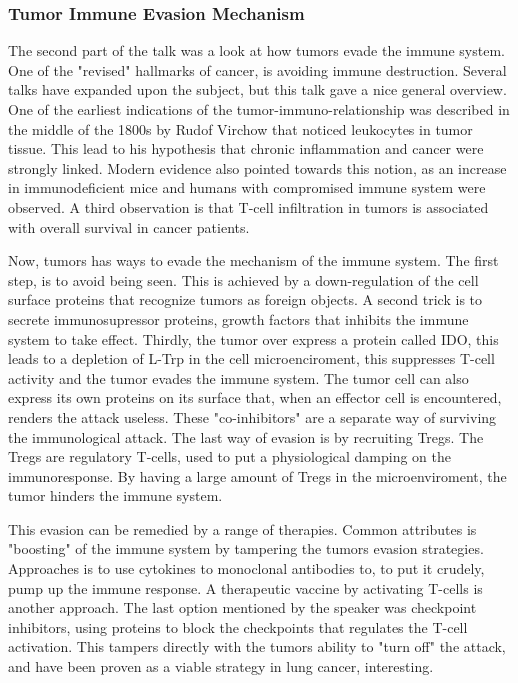 \documentclass[12p]{article}
\begin{document}
\subsubsection*{Tumor Immune Evasion Mechanism}

The second part of the talk was a look at how tumors evade the immune system.
One of the "revised" hallmarks of cancer, is avoiding immune destruction.
Several talks have expanded upon the subject, but this talk gave a nice general overview.
One of the earliest indications of the tumor-immuno-relationship was described in the middle of the 1800s by Rudof Virchow that noticed leukocytes in tumor tissue.
This lead to his hypothesis that chronic inflammation and cancer were strongly linked.
Modern evidence also pointed towards this notion, as an increase in immunodeficient mice and humans with compromised immune system were observed.
A third observation is that T-cell infiltration in tumors is associated with overall survival in cancer patients.

Now, tumors has ways to evade the mechanism of the immune system.
The first step, is to avoid being seen.
This is achieved by a down-regulation of the cell surface proteins that recognize tumors as foreign objects.
A second trick is to secrete immunosupressor proteins, growth factors that inhibits the immune system to take effect.
Thirdly, the tumor over express a protein called IDO, this leads to a depletion of L-Trp in the cell microenciroment, this suppresses T-cell activity and the tumor evades the immune system.
The tumor cell can also express its own proteins on its surface that, when an effector cell is encountered, renders the attack useless.
These "co-inhibitors" are a separate way of surviving the immunological attack.
The last way of evasion is by recruiting Tregs.
The Tregs are regulatory T-cells, used to put a physiological damping on the immunoresponse.
By having a large amount of Tregs in the microenviroment, the tumor hinders the immune system.

This evasion can be remedied by a range of therapies.
Common attributes is "boosting" of the immune system by tampering the tumors evasion strategies.
Approaches is to use cytokines to  monoclonal antibodies to, to put it crudely, pump up the immune response.
A therapeutic vaccine by activating T-cells is another approach.
The last option mentioned by the speaker was checkpoint inhibitors, using proteins to block the checkpoints that regulates the T-cell activation.
This tampers directly with the tumors ability to "turn off" the attack, and have been proven as a viable strategy in lung cancer, interesting.
\end{document}
